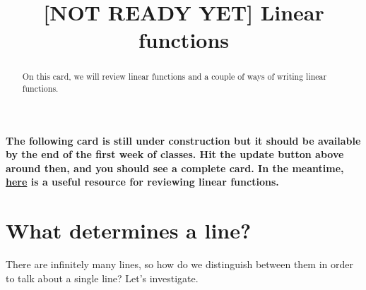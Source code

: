 \documentclass{ximera}
\title[Dig-In:]{[NOT READY YET] Linear functions}
\begin{document}
\begin{abstract}
On this card, we will review linear functions and a couple of ways of writing linear functions. 
\end{abstract}
\maketitle

\textbf{The following card is still under construction but it should be available by the end of the first week of classes.  Hit the update button above around then, and you should see a complete card.  In the meantime, \href{http://tutorial.math.lamar.edu/Classes/Alg/Lines.aspx}{here} is a useful resource for reviewing linear functions.}

\section{What determines a line?}

There are infinitely many lines, so how do we distinguish between them in order to talk about a single line?  Let's investigate. 
\end{document}
